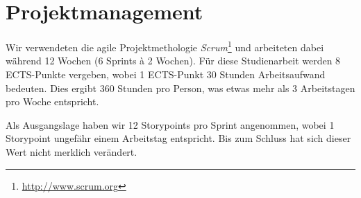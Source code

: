 \chapter{Projektmanagement}
\label{projektmanagement}

Wir verwendeten die agile Projektmethologie \emph{Scrum}\footnote{\url{http://www.scrum.org}} und arbeiteten dabei während 12 Wochen (6 Sprints à 2 Wochen).
Für diese Studienarbeit werden 8 ECTS-Punkte vergeben, wobei 1 ECTS-Punkt 30 Stunden Arbeitsaufwand bedeuten.
Dies ergibt 360 Stunden pro Person, was etwas mehr als 3 Arbeitstagen pro Woche entspricht.

Als Ausgangslage haben wir 12 Storypoints pro Sprint angenommen, wobei 1 Storypoint ungefähr einem Arbeitstag entspricht. 
Bis zum Schluss hat sich dieser Wert nicht merklich verändert.













